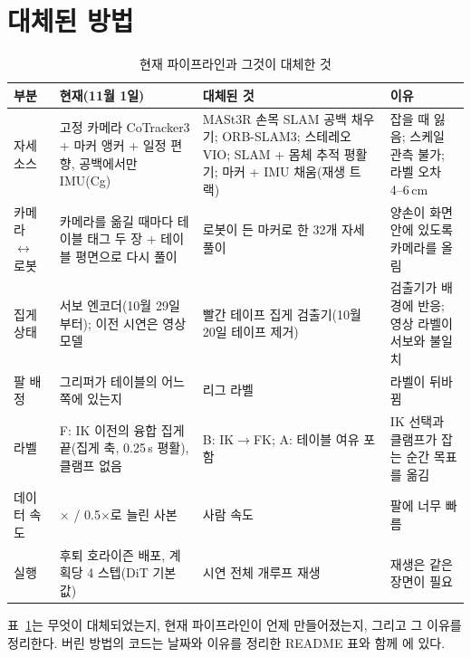 \documentclass[conference,10pt]{IEEEtran}
\begin{document}
\section{대체된 방법}\label{sec:superseded}
\begin{table}[t]
\caption{현재 파이프라인과 그것이 대체한 것}\label{tab:superseded}
\centering\small
\begin{tabular}{@{}>{\raggedright\arraybackslash}p{}>{\raggedright\arraybackslash}p{}>{\raggedright\arraybackslash}p{}>{\raggedright\arraybackslash}p{}@{}}
\toprule
부분 & 현재(11월 1일) & 대체된 것 & 이유 \\
\midrule
자세 소스 & 고정 카메라 CoTracker3 + 마커 앵커 + 일정 편향, 공백에서만 IMU(Cg) & MASt3R 손목 SLAM 공백 채우기; ORB-SLAM3;
스테레오 VIO; SLAM + 몸체 추적 평활기; 마커 + IMU 채움(재생 트랙) & 잡을 때 잃음; 스케일 관측 불가; 라벨 오차 4--6\,cm \\
카메라 $\leftrightarrow$ 로봇 & 카메라를 옮길 때마다 테이블 태그 두 장 + 테이블 평면으로 다시 풀이 & 로봇이 든 마커로 한 32개 자세 풀이 &
양손이 화면 안에 있도록 카메라를 올림 \\
집게 상태 & 서보 엔코더(10월 29일부터); 이전 시연은 영상 모델 & 빨간 테이프 집게 검출기(10월 20일 테이프 제거) & 검출기가 배경에
반응; 영상 라벨이 서보와 불일치 \\
팔 배정 & 그리퍼가 테이블의 어느 쪽에 있는지 & 리그 라벨 & 라벨이 뒤바뀜 \\
라벨 & F: IK 이전의 융합 집게 끝(집게 축, 0.25\,s 평활), 클램프 없음 & B: IK$\to$FK; A: 테이블 여유 포함 & IK 선택과 클램프가 잡는 순간 목표를 옮김 \\
데이터 속도 & 0.3$\times$ / 0.5$\times$로 늘린 사본 & 사람 속도 & 팔에 너무 빠름 \\
실행 & 후퇴 호라이즌 배포, 계획당 4 스텝(DiT 기본값) & 시연 전체 개루프 재생 & 재생은 같은 장면이 필요 \\
\bottomrule
\end{tabular}
\end{table}

표~\ref{tab:superseded}는 무엇이 대체되었는지, 현재 파이프라인이 언제 만들어졌는지, 그리고 그 이유를 정리한다. 버린 방법의 코드는
날짜와 이유를 정리한 README 표와 함께 에 있다.

\end{document}
